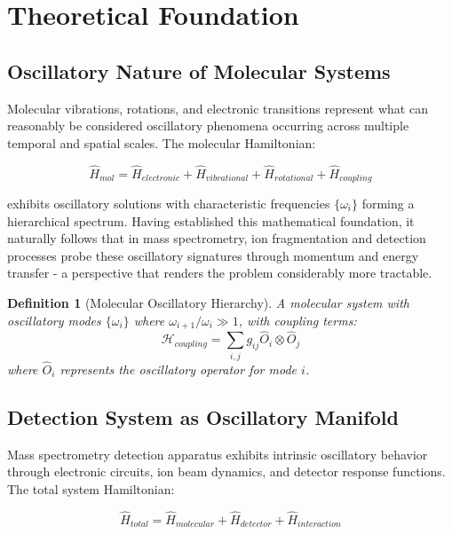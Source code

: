 \documentclass[11pt,a4paper]{article}
\newtheorem{definition}{Definition}
\begin{document}
\section{Theoretical Foundation}

\subsection{Oscillatory Nature of Molecular Systems}

Molecular vibrations, rotations, and electronic transitions represent what can reasonably be considered oscillatory phenomena occurring across multiple temporal and spatial scales. The molecular Hamiltonian:

\begin{equation}
\hat{H}_{mol} = \hat{H}_{electronic} + \hat{H}_{vibrational} + \hat{H}_{rotational} + \hat{H}_{coupling}
\end{equation}

exhibits oscillatory solutions with characteristic frequencies $\{\omega_i\}$ forming a hierarchical spectrum. Having established this mathematical foundation, it naturally follows that in mass spectrometry, ion fragmentation and detection processes probe these oscillatory signatures through momentum and energy transfer - a perspective that renders the problem considerably more tractable.

\begin{definition}[Molecular Oscillatory Hierarchy]
A molecular system with oscillatory modes $\{\omega_i\}$ where $\omega_{i+1}/\omega_i \gg 1$, with coupling terms:
\begin{equation}
\mathcal{H}_{coupling} = \sum_{i,j} g_{ij} \hat{O}_i \otimes \hat{O}_j
\end{equation}
where $\hat{O}_i$ represents the oscillatory operator for mode $i$.
\end{definition}

\subsection{Detection System as Oscillatory Manifold}

Mass spectrometry detection apparatus exhibits intrinsic oscillatory behavior through electronic circuits, ion beam dynamics, and detector response functions. The total system Hamiltonian:

\begin{equation}
\hat{H}_{total} = \hat{H}_{molecular} + \hat{H}_{detector} + \hat{H}_{interaction}
\end{equation}
\end{document}
